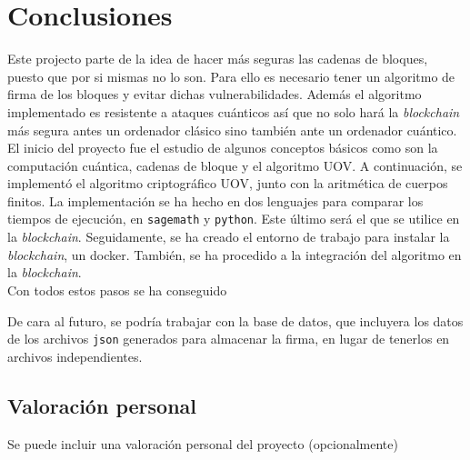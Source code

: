 \chapter{Conclusiones}

Este projecto parte de la idea de hacer más seguras las cadenas de bloques, puesto que por si mismas no lo son. Para ello es necesario tener un algoritmo de firma de los bloques y evitar dichas vulnerabilidades. Además el algoritmo implementado es resistente a ataques cuánticos así que no solo hará la \textit{blockchain} más segura antes un ordenador clásico sino también ante un ordenador cuántico.\\

El inicio del proyecto fue el estudio de algunos conceptos básicos como son la computación cuántica, cadenas de bloque y el algoritmo UOV. A continuación, se implementó el algoritmo criptográfico UOV, junto con la aritmética de cuerpos finitos. La implementación se ha hecho en dos lenguajes para comparar los tiempos de ejecución, en \texttt{sagemath} y \texttt{python}. Este último será el que se utilice en la \textit{blockchain}. Seguidamente, se ha creado el entorno de trabajo para instalar la \textit{blockchain}, un docker. También, se ha procedido a la integración del algoritmo en la \textit{blockchain}.\\

Con todos estos pasos se ha conseguido 


De cara al futuro, se podría trabajar con la base de datos, que incluyera los datos de los archivos \texttt{json} generados para almacenar la firma, en lugar de tenerlos en archivos independientes.\\

 







\section{Valoración personal}
Se puede incluir una valoración personal del proyecto (opcionalmente)